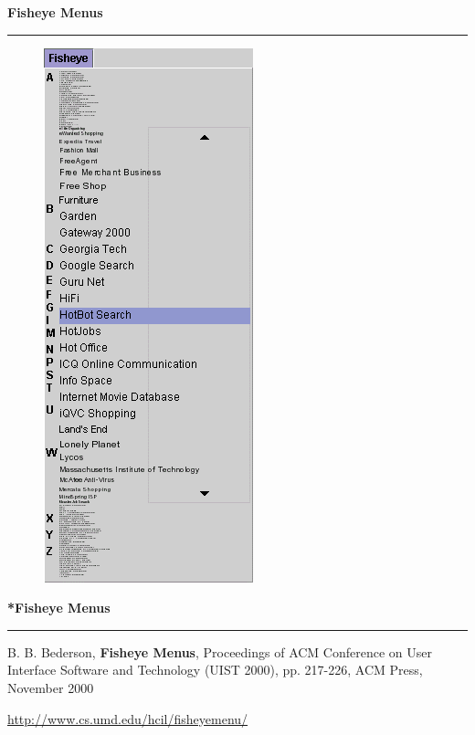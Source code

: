 \documentclass[pdf]{beamer}
\begin{document}
\begin{frame}
{\textbf{Fisheye Menus}}{\textcolor{red}{\rule{12cm}{1.2pt}}}

\begin{figure}
\includegraphics[scale=0.43]{33_fisheye_menu.png}
\end{figure}

\end{frame}



\begin{frame}
{\textbf{*Fisheye Menus}}{\textcolor{red}{\rule{12cm}{1.2pt}}}

B. B. Bederson, \textbf{Fisheye Menus}, Proceedings of ACM Conference on User Interface Software and Technology (UIST 2000), pp. 217-226, ACM Press, November 2000
\newline
    
\url{http://www.cs.umd.edu/hcil/fisheyemenu/}
\end{frame}
\end{document}
